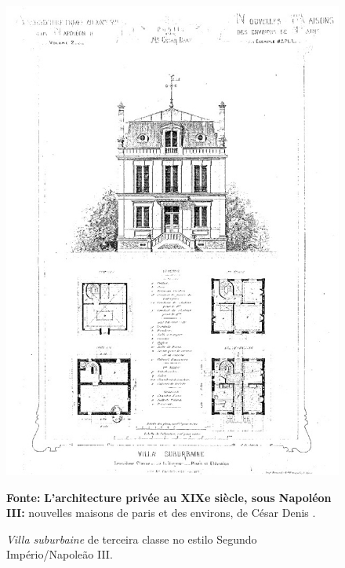 \begin{figure}[!htp]
\centering
\caption{\textit{Villa suburbaine} de terceira classe no estilo Segundo Império/Napoleão III.}
\includegraphics[width=1\textwidth]{2-cap1/complementos/fotos/daly03-8.JPEG}{\par \footnotesize \textbf{Fonte:} \textbf{L’architecture privée au XIXe siècle, sous Napoléon III:} nouvelles maisons de paris et des environs, de César Denis . \par}
\label{fig:villaterclas} 
\end{figure}


